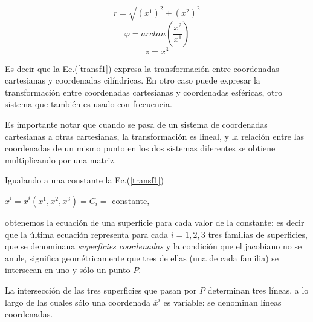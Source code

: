 $$r= \sqrt{  (x^1)^2  +  (x^2)^2} $$
$$ \varphi= arctan( \frac{x^2}{x^1})$$
$$z=x^3$$

Es decir que  la Ec.(\ref{transf1}) expresa la transformación  entre coordenadas cartesianas y coordenadas cilíndricas. En otro caso puede expresar la transformación  entre coordenadas cartesianas y coordenadas esféricas, otro sistema que  también es usado con frecuencia.

Es importante notar que cuando se pasa de un sistema de coordenadas cartesianas a otras cartesianas, la transformación es lineal, y la relación entre las coordenadas de un mismo punto en los dos sistemas diferentes se obtiene  multiplicando por una matriz. 


\bigskip


Igualando a una constante la Ec.(\ref{transf1})

\bigskip

$\overline x^{i} = \overline x^{i}( x^1, x^{2}, x^{3})= C_i =$ constante, 

\bigskip

\noindent
obtenemos la ecuación de una superficie para cada valor de la constante: es decir que la última ecuación  representa para cada $i=1,2,3$ tres familias de superficies, que se denominana \textit{superficies coordenadas} y la condición que el jacobiano no se anule, significa geométricamente  que tres de ellas (una de cada familia) se intersecan en uno y sólo un punto $P$.

\bigskip

La intersección de las tres superficies   que pasan por $P$ determinan tres líneas, a lo largo de las cuales sólo una coordenada $\overline x^i$ es variable: se denominan líneas coordenadas.

\bigskip











